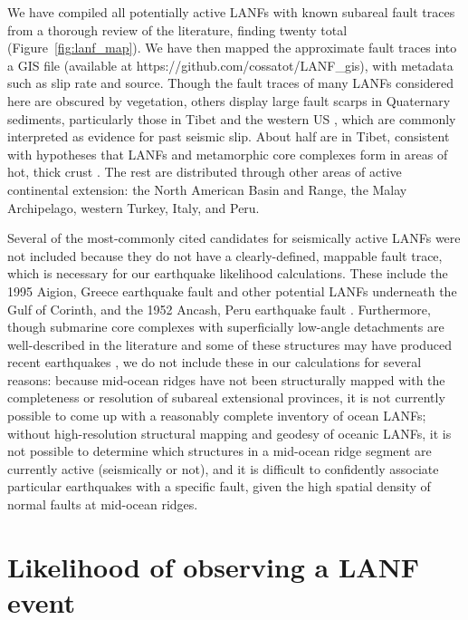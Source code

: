 \documentclass[twocolumn,grl]{AGUTeX}
\begin{document}
\begin{article}
We have compiled all potentially active LANFs with known subareal fault traces
from a thorough review of the literature, finding twenty total
(Figure~\ref{fig:lanf_map}).  We have then mapped the approximate fault traces
into a GIS file (available at https://github.com/cossatot/LANF\_gis), with
metadata such as slip rate and source. Though the fault traces of many LANFs
considered here are obscured by vegetation, others display large fault scarps
in Quaternary sediments, particularly those in Tibet
\citep[e.g.,][]{styron2013slr, kapp2005nqtl} and the western US
\citep[e.g.,][]{axen1999baja, hayman2003dv}, which are commonly interpreted as
evidence for past seismic slip.  About half are in Tibet, consistent with
hypotheses that LANFs and metamorphic core complexes form in areas of hot,
thick crust \citep [e.g.,][]{buck1991mcc}.  The rest are distributed through
other areas of active continental extension: the North American Basin and
Range, the Malay Archipelago, western Turkey, Italy, and Peru. 

Several of the most-commonly cited candidates for seismically active LANFs were
not included because they do not have a clearly-defined, mappable fault trace,
which is necessary for our earthquake likelihood calculations.  These include
the 1995 Aigion, Greece earthquake fault \citep{bernard1997} and other
potential LANFs underneath the Gulf of Corinth, and the 1952 Ancash, Peru
earthquake fault \citep{doser1987ancash}. Furthermore, though submarine core
complexes with superficially low-angle detachments are well-described in the
literature and some of these structures may have produced recent earthquakes
\citep{abers2001}, we do not include these in our calculations for several
reasons: because mid-ocean ridges have not been structurally mapped with the
completeness or resolution of subareal extensional provinces, it is not
currently possible to come up with a reasonably complete inventory of ocean
LANFs; without high-resolution structural mapping and geodesy of oceanic LANFs,
it is not possible to determine which structures in a mid-ocean ridge segment
are currently active (seismically or not), and it is difficult to confidently
associate particular earthquakes with a specific fault, given the high spatial
density of normal faults at mid-ocean ridges.


\section{Likelihood of observing a LANF event}

\end{article}
\end{document}
